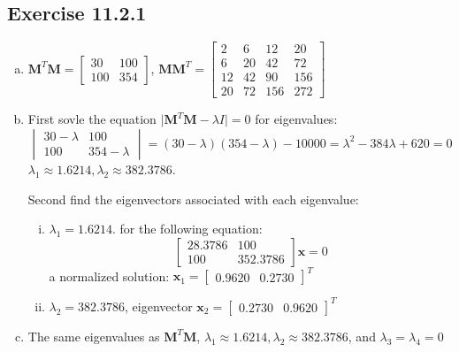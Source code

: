 \documentclass[11pt]{article}
\providecommand{\abs}[1]{\lvert#1\rvert}
\newcommand{\bM}{ \bm{M} }
\newcommand{\bx}{ \bm{x} }
\begin{document}
\subsection*{Exercise 11.2.1}
\begin{enumerate}[(a)]
\item $\bM^T\bM =
  \begin{bmatrix}
    30 & 100 \\
    100 & 354 
  \end{bmatrix}
$, $\bM\bM^T =
\begin{bmatrix}
  2 & 6 & 12 & 20 \\
  6 & 20 & 42 & 72 \\
  12 & 42 & 90 & 156 \\
  20 & 72 & 156 & 272
\end{bmatrix}
$
\item First sovle the equation $\abs{\bM^T\bM - \lambda I} = 0$ for eigenvalues:
  \[
    \begin{vmatrix}
      30 - \lambda & 100 \\
      100 & 354 - \lambda
    \end{vmatrix}
    = (30 -\lambda)(354-\lambda) - 10000 = \lambda^2 - 384\lambda + 620 = 0
  \]
  $\lambda_1 \approx 1.6214, \lambda_2 \approx 382.3786$.

  Second find the eigenvectors associated with each eigenvalue:
  \begin{enumerate}[i.]
  \item $\lambda_1 = 1.6214$. for the following equation:
    \[
      \begin{bmatrix}
        28.3786 & 100 \\
        100 &  352.3786
      \end{bmatrix}
       \bx = 0
     \]
     a normalized solution: $\bx_1 =
     \begin{bmatrix}
       0.9620 & 0.2730
     \end{bmatrix}^T
$
\item $\lambda_2 = 382.3786$, eigenvector $\bx_2 =
  \begin{bmatrix}
    0.2730 & 0.9620
  \end{bmatrix}^T
  $
  \end{enumerate}
\item The same eigenvalues as $\bM^T\bM$, $\lambda_1 \approx 1.6214, \lambda_2
  \approx 382.3786$, and $\lambda_3 = \lambda_4 = 0$
  

\end{enumerate}
\end{document}
